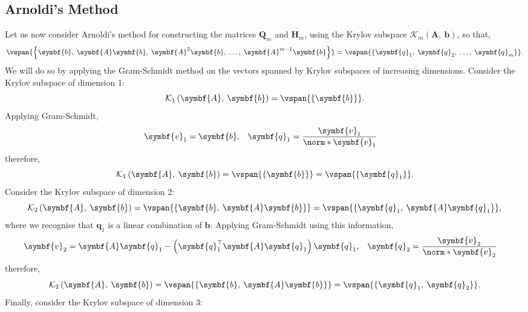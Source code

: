 \documentclass{article}
\begin{document}
\subsection{Arnoldi's Method}
Let us now consider Arnoldi's method for constructing the matrices
\(\symbf{Q}_m\) and \(\symbf{H}_m\), using the Krylov subspace
\(\mathcal{K}_m\left( \symbf{A},\: \symbf{b} \right)\), so that,
\begin{equation*}
    \vspan{\left\{ \symbf{b},\: \symbf{A}\symbf{b},\: \symbf{A}^2\symbf{b},\: \ldots,\: \symbf{A}^{m-1}\symbf{b} \right\}} = \vspan{\left\{ \symbf{q}_1,\: \symbf{q}_2,\: \ldots,\: \symbf{q}_m \right\}}.
\end{equation*}
We will do so by applying the Gram-Schmidt method on the vectors spanned
by Krylov subspaces of increasing dimensions. Consider the Krylov
subspace of dimension 1:
\begin{equation*}
    \mathcal{K}_1\left( \symbf{A},\: \symbf{b} \right) = \vspan{\left\{ \symbf{b} \right\}}.
\end{equation*}
Applying Gram-Schmidt,
\begin{align*}
    \symbf{v}_1 & = \symbf{b}, & \symbf{q}_1 & = \frac{\symbf{v}_1}{\norm*{\symbf{v}_1}}
\end{align*}
therefore,
\begin{equation*}
    \mathcal{K}_1\left( \symbf{A},\: \symbf{b} \right) = \vspan{\left\{ \symbf{b} \right\}} = \vspan{\left\{ \symbf{q}_1 \right\}}.
\end{equation*}
Consider the Krylov subspace of dimension 2:
\begin{equation*}
    \mathcal{K}_2\left( \symbf{A},\: \symbf{b} \right) = \vspan{\left\{ \symbf{b},\: \symbf{A}\symbf{b} \right\}} = \vspan{\left\{ \symbf{q}_1,\: \symbf{A}\symbf{q}_1 \right\}},
\end{equation*}
where we recognise that \(\symbf{q}_1\) is a linear combination of
\(\symbf{b}\). Applying Gram-Schmidt using this information,
\begin{align*}
    \symbf{v}_2 & = \symbf{A}\symbf{q}_1 - \left( \symbf{q}_1^\top \symbf{A}\symbf{q}_1 \right) \symbf{q}_1, & \symbf{q}_2 & = \frac{\symbf{v}_2}{\norm*{\symbf{v}_2}}
\end{align*}
therefore,
\begin{equation*}
    \mathcal{K}_2\left( \symbf{A},\: \symbf{b} \right) = \vspan{\left\{ \symbf{b},\: \symbf{A}\symbf{b} \right\}} = \vspan{\left\{ \symbf{q}_1,\: \symbf{q}_2 \right\}}.
\end{equation*}
Finally, consider the Krylov subspace of dimension 3:
\end{document}
